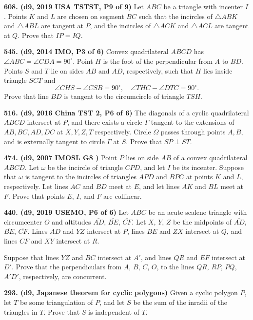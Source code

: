 \documentclass{article}
\begin{document}
\textbf{608. (\color{red}d9\color{black}, 2019 USA TSTST, P9 of 9)} Let $ABC$ be a triangle with incenter $I$. Points $K$ and $L$ are chosen on segment $BC$ such that the incircles of $\triangle ABK$ and $\triangle ABL$ are tangent at $P$, and the incircles of $\triangle ACK$ and $\triangle ACL$ are tangent at $Q$. Prove that $IP=IQ$.

\textbf{545. (\color{red}d9\color{black}, 2014 IMO, P3 of 6)} Convex quadrilateral $ABCD$ has $\angle ABC = \angle CDA = 90^{\circ}$. Point $H$ is the foot of the perpendicular from $A$ to $BD$. Points $S$ and $T$ lie on sides $AB$ and $AD$, respectively, such that $H$ lies inside triangle $SCT$ and \[ \angle CHS - \angle CSB = 90^{\circ}, \quad \angle THC - \angle DTC = 90^{\circ}. \] Prove that line $BD$ is tangent to the circumcircle of triangle $TSH$.

\textbf{516. (\color{red}d9\color{black}, 2016 China TST 2, P6 of 6)} The diagonals of a cyclic quadrilateral $ABCD$ intersect at $P$, and there exists a circle $\Gamma$ tangent to the extensions of $AB,BC,AD,DC$ at $X,Y,Z,T$ respectively. Circle $\Omega$ passes through points $A,B$, and is externally tangent to circle $\Gamma$ at $S$. Prove that $SP\perp ST$.

\textbf{474. (\color{red}d9\color{black}, 2007 IMOSL G8
    )} Point $ P$ lies on side $ AB$ of a convex quadrilateral $ ABCD$. Let $ \omega$ be the incircle of triangle $ CPD$, and let $ I$ be its incenter. Suppose that $ \omega$ is tangent to the incircles of triangles $ APD$ and $ BPC$ at points $ K$ and $ L$, respectively. Let lines $ AC$ and $ BD$ meet at $ E$, and let lines $ AK$ and $ BL$ meet at $ F$. Prove that points $ E$, $ I$, and $ F$ are collinear.

\textbf{440. (\color{red}d9\color{black}, 2019 USEMO, P6 of 6)} Let $ABC$ be an acute scalene triangle with circumcenter $O$ and altitudes $\overline{AD}$, $\overline{BE}$, $\overline{CF}$. Let $X$, $Y$, $Z$ be the midpoints of $\overline{AD}$, $\overline{BE}$, $\overline{CF}$. Lines $AD$ and $YZ$ intersect at $P$, lines $BE$ and $ZX$ intersect at $Q$, and lines $CF$ and $XY$ intersect at $R$.

Suppose that lines $YZ$ and $BC$ intersect at $A'$, and lines $QR$ and $EF$ intersect at $D'$. Prove that the perpendiculars from $A$, $B$, $C$, $O$, to the lines $QR$, $RP$, $PQ$, $A'D'$, respectively, are concurrent.

\textbf{293. (\color{red}d9\color{black}, Japanese theorem for cyclic polygons)} Given a cyclic polygon \(P\), let \(T\) be some triangulation of \(P\), and let \(S\) be the sum of the inradii of the triangles in \(T\). Prove that \(S\) is independent of \(T\).
\end{document}

